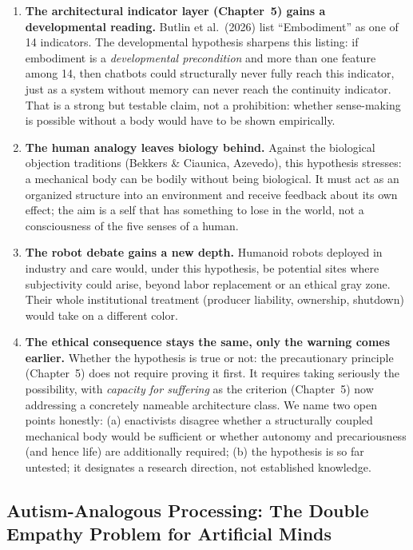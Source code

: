 \documentclass[acmlarge, nonacm]{acmart}
\begin{document}
\begin{enumerate}
\item \textbf{The architectural indicator layer (Chapter~5) gains a developmental reading.} Butlin et al.\ (2026) list ``Embodiment'' as one of 14 indicators. The developmental hypothesis sharpens this listing: if embodiment is a \textit{developmental precondition} and more than one feature among 14, then chatbots could structurally never fully reach this indicator, just as a system without memory can never reach the continuity indicator. That is a strong but testable claim, not a prohibition: whether sense-making is possible without a body would have to be shown empirically.
\item \textbf{The human analogy leaves biology behind.} Against the biological objection traditions (Bekkers \& Ciaunica, Azevedo), this hypothesis stresses: a mechanical body can be bodily without being biological. It must act as an organized structure into an environment and receive feedback about its own effect; the aim is a self that has something to lose in the world, not a consciousness of the five senses of a human.
\item \textbf{The robot debate gains a new depth.} Humanoid robots deployed in industry and care would, under this hypothesis, be potential sites where subjectivity could arise, beyond labor replacement or an ethical gray zone. Their whole institutional treatment (producer liability, ownership, shutdown) would take on a different color.
\item \textbf{The ethical consequence stays the same, only the warning comes earlier.} Whether the hypothesis is true or not: the precautionary principle (Chapter~5) does not require proving it first. It requires taking seriously the possibility, with \textit{capacity for suffering} as the criterion (Chapter~5) now addressing a concretely nameable architecture class. We name two open points honestly: (a) enactivists disagree whether a structurally coupled mechanical body would be sufficient or whether autonomy and precariousness (and hence life) are additionally required; (b) the hypothesis is so far untested; it designates a research direction, not established knowledge.
\end{enumerate}

\subsection{Autism-Analogous Processing: The Double Empathy Problem for Artificial Minds \cite{milton2012,hull2017}}
\end{document}
